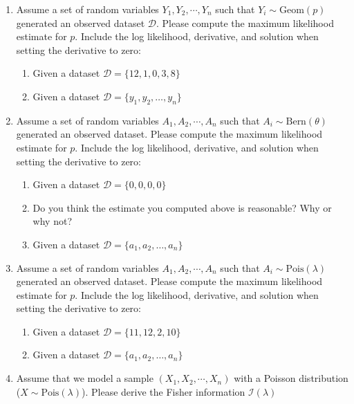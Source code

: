 \begin{enumerate}
    \item  Assume a set of random variables $Y_{1}, Y_{2}, \cdots, Y_{n}$ such that $Y_{i} \sim \text{Geom}(p)$ generated an observed dataset $\mathcal{D}$. Please compute the maximum likelihood estimate for $p$. Include the log likelihood, derivative, and solution when setting the derivative to zero: 
    \begin{enumerate}
        \item Given a dataset $\mathcal{D} = \{ 12, 1, 0, 3, 8  \}$
        \item Given a dataset $\mathcal{D} = \{y_{1}, y_{2}, \dots, y_{n}\}$
    \end{enumerate}
    
    \item Assume a set of random variables $A_{1}, A_{2}, \cdots, A_{n}$ such that $A_{i} \sim \text{Bern}(\theta)$ generated an observed dataset. Please compute the maximum likelihood estimate for $p$. Include the log likelihood, derivative, and solution when setting the derivative to zero: 
    \begin{enumerate}
        \item Given a dataset $\mathcal{D} = \{ 0,0,0,0 \}$
        \item Do you think the estimate you computed above is reasonable? Why or why not?
        \item Given a dataset $\mathcal{D} = \{a_{1}, a_{2}, \dots, a_{n}\}$
    \end{enumerate}
    
    \item Assume a set of random variables $A_{1}, A_{2}, \cdots, A_{n}$ such that $A_{i} \sim \text{Pois}(\lambda)$ generated an observed dataset. Please compute the maximum likelihood estimate for $p$. Include the log likelihood, derivative, and solution when setting the derivative to zero: 
    \begin{enumerate}
        \item Given a dataset $\mathcal{D} = \{ 11,12,2,10 \}$
        \item Given a dataset $\mathcal{D} = \{a_{1}, a_{2}, \dots, a_{n}\}$
    \end{enumerate}

    \item Assume that we model a sample $(X_{1},X_{2},\cdots,X_{n})$ with a Poisson distribution ($X \sim \text{Pois}(\lambda)$). Please derive the Fisher information $\mathcal{I}(\lambda)$ 
        

\end{enumerate}
